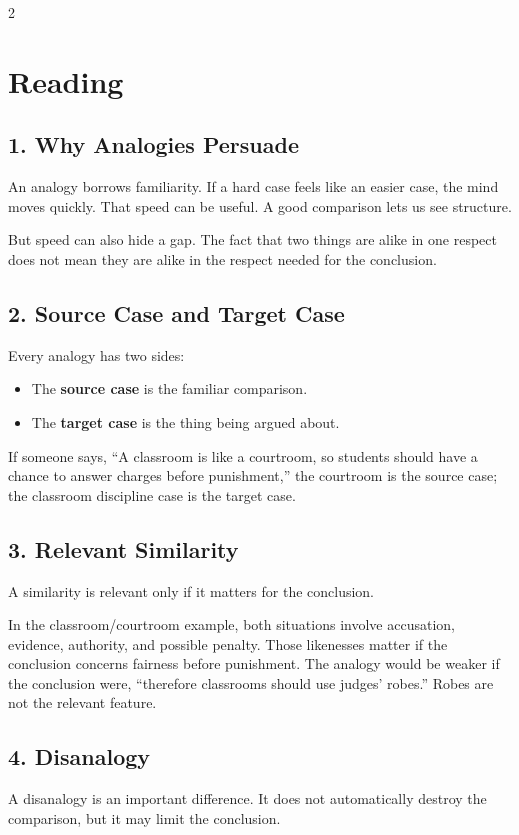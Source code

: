 \documentclass[12pt]{article}
\begin{document}
\begin{multicols}{2}
\section*{Reading}

\subsection*{1. Why Analogies Persuade}
An analogy borrows familiarity. If a hard case feels like an easier case, the mind moves quickly. That speed can be useful. A good comparison lets us see structure.

But speed can also hide a gap. The fact that two things are alike in one respect does not mean they are alike in the respect needed for the conclusion.

\subsection*{2. Source Case and Target Case}
Every analogy has two sides:
\begin{itemize}[leftmargin=*]
\item The \textbf{source case} is the familiar comparison.
\item The \textbf{target case} is the thing being argued about.
\end{itemize}
If someone says, ``A classroom is like a courtroom, so students should have a chance to answer charges before punishment,'' the courtroom is the source case; the classroom discipline case is the target case.

\subsection*{3. Relevant Similarity}
A similarity is relevant only if it matters for the conclusion.

In the classroom/courtroom example, both situations involve accusation, evidence, authority, and possible penalty. Those likenesses matter if the conclusion concerns fairness before punishment. The analogy would be weaker if the conclusion were, ``therefore classrooms should use judges' robes.'' Robes are not the relevant feature.

\subsection*{4. Disanalogy}
A disanalogy is an important difference. It does not automatically destroy the comparison, but it may limit the conclusion.


\end{multicols}
\end{document}
